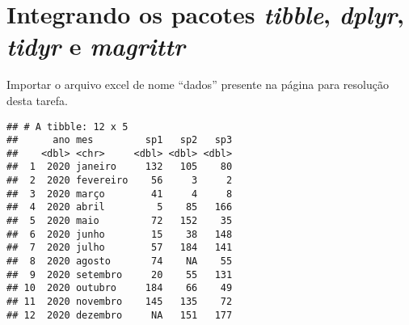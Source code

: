 \documentclass[]{book}
\newenvironment{Shaded}{\begin{snugshade}}{\end{snugshade}}
\newcommand{\DataTypeTok}[1]{\textcolor[rgb]{0.13,0.29,0.53}{#1}}
\newcommand{\DecValTok}[1]{\textcolor[rgb]{0.00,0.00,0.81}{#1}}
\newcommand{\KeywordTok}[1]{\textcolor[rgb]{0.13,0.29,0.53}{\textbf{#1}}}
\newcommand{\NormalTok}[1]{#1}
\newcommand{\OperatorTok}[1]{\textcolor[rgb]{0.81,0.36,0.00}{\textbf{#1}}}
\newcommand{\StringTok}[1]{\textcolor[rgb]{0.31,0.60,0.02}{#1}}
\begin{document}
\hypertarget{integrando-os-pacotes-tibble-dplyr-tidyr-e-magrittr}{%
\chapter{\texorpdfstring{Integrando os pacotes \emph{tibble}, \emph{dplyr}, \emph{tidyr} e \emph{magrittr}}{Integrando os pacotes tibble, dplyr, tidyr e magrittr}}\label{integrando-os-pacotes-tibble-dplyr-tidyr-e-magrittr}}

Importar o arquivo excel de nome ``dados'' presente na página para resolução desta tarefa.

\begin{Shaded}
\end{Shaded}

\begin{verbatim}
## # A tibble: 12 x 5
##      ano mes         sp1   sp2   sp3
##    <dbl> <chr>     <dbl> <dbl> <dbl>
##  1  2020 janeiro     132   105    80
##  2  2020 fevereiro    56     3     2
##  3  2020 março        41     4     8
##  4  2020 abril         5    85   166
##  5  2020 maio         72   152    35
##  6  2020 junho        15    38   148
##  7  2020 julho        57   184   141
##  8  2020 agosto       74    NA    55
##  9  2020 setembro     20    55   131
## 10  2020 outubro     184    66    49
## 11  2020 novembro    145   135    72
## 12  2020 dezembro     NA   151   177
\end{verbatim}
\end{document}
